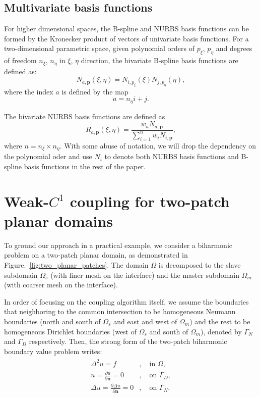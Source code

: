 \documentclass[preprint,12pt]{elsarticle}
\begin{document}
\subsection{Multivariate basis functions}
For higher dimensional spaces, the B-spline and NURBS basis functions can be formed by the Kronecker product of vectors of univariate basis functions. For a two-dimensional parametric space, given polynomial orders of $p_\xi$, $p_\eta$ and degrees of freedom $n_\xi$, $n_\eta$ in $\xi$, $\eta$ direction, the bivariate B-spline basis functions are defined as:
\begin{equation}
N_{a,\mathbf{p}}(\xi,\eta)=N_{i,p_\xi}(\xi)N_{j,p_\eta}(\eta),
\end{equation}
where the index $a$ is defined by the map
\begin{equation}
a=n_\eta{i}+j.
\end{equation}\par
The bivariate NURBS basis functions are defined as
\begin{equation}
    R_{a,\mathbf{p}}(\xi,\eta)=\frac{w_{a}N_{a,\mathbf{p}}}{\sum_{i=1}^{n}{w_{i}N_{i,\mathbf{p}}}},
\end{equation}
where $n=n_\xi\times{}n_\eta$. 
With some abuse of notation, we will drop the dependency on the polynomial oder and use $N_{i}$ to denote both NURBS basis functions and B-spline basis functions in the rest of the paper.\par
\section{Weak-$C^1$ coupling for two-patch planar domains}
To ground our approach in a practical example, we consider a biharmonic problem on a two-patch planar domain, as demonstrated in Figure.~\ref{fig:two_planar_patches}. The domain $\Omega$ is decomposed to the slave subdomain $\Omega_s$ (with finer mesh on the interface) and the master subdomain $\Omega_m$ (with coarser mesh on the interface). \par
In order of focusing on the coupling algorithm itself, we assume the boundaries that neighboring to the common intersection to be homogeneous Neumann boundaries (north and south of $\Omega_s$ and east and west of $\Omega_m$) and the rest to be homogeneous Dirichlet boundaries (west of $\Omega_s$ and south of $\Omega_m$), denoted by $\Gamma_N$ and $\Gamma_D$ respectively. Then, the strong form of the two-patch biharmonic boundary value problem writes:
\begin{align}
    \begin{split}
        \Delta^2u=f&,\quad \text{in }\Omega, \\
        u=\frac{\partial{u}}{\partial{\mathbf{n}}}=0&, \quad \text{on }\Gamma_D, \\
        \Delta{u}=\frac{\partial{\Delta{u}}}{\partial{\mathbf{n}}}=0&, \quad \text{on }\Gamma_N.
    \end{split}\label{eq:strong_biharmonic}
\end{align}
\end{document}
